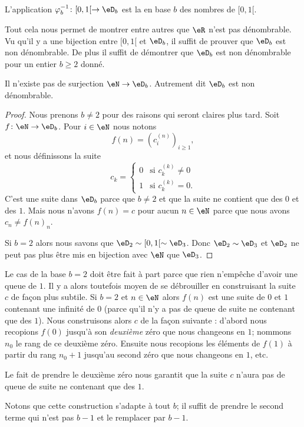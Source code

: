 L'application \( \varphi_b^{-1}\colon \mathopen[ 0 , 1 [\to \eD_b\) est la  en base \( b\) des nombres de \( \mathopen[ 0 , 1 [\).

Tout cela nous permet de montrer entre autres que \( \eR\) n'est pas dénombrable. Vu qu'il y a une bijection entre \( \mathopen[ 0 , 1 [\) et \( \eD_b\), il suffit de prouver que \( \eD_b\) est non dénombrable. De plus il suffit de démontrer que \( \eD_b\) est non dénombrable pour un entier \( b\geq 2\) donné.

\begin{proposition}  \label{PropNNHooYTVFw}
	Il n'existe pas de surjection \( \eN\to \eD_b\). Autrement dit \( \eD_b\) est non dénombrable.
\end{proposition}

\begin{proof}
	Nous prenons \( b\neq 2\) pour des raisons qui seront claires plus tard. Soit \( f\colon \eN\to \eD_b\). Pour \( i\in \eN\) nous notons
	\begin{equation}
		f(n)=(c_i^{(n)})_{i\geq 1},
	\end{equation}
	et nous définissons la suite
	\begin{equation}
		c_k=\begin{cases}
			0 & \text{si } c_k^{(k)}\neq 0 \\
			1 & \text{si } c_k^{(k)}=0.
		\end{cases}
	\end{equation}
	C'est une suite dans \( \eD_b\) parce que \( b\neq 2\) et que la suite ne contient que des \( 0\) et des \( 1\). Mais nous n'avons \( f(n)=c\) pour aucun \( n\in \eN\) parce que nous avons \( c_n\neq f(n)_n\).

	Si \( b=2\) alors nous savons que \( \eD_2\sim\mathopen[ 0 , 1 [\sim \eD_3\). Donc \( \eD_2\sim \eD_3\) et \( \eD_2\) ne peut pas plus être mis en bijection avec \( \eN\) que \( \eD_3\).
\end{proof}

\begin{remark}
	Le cas de la base \( b=2\) doit être fait à part parce que rien n'empêche d'avoir une queue de \( 1\). Il y a alors toutefois moyen de se débrouiller en construisant la suite \( c\) de façon plus subtile. Si \( b=2\) et \( n\in \eN\) alors \( f(n)\) est une suite de \( 0\) et \( 1\) contenant une infinité de \( 0\) (parce qu'il n'y a pas de queue de suite ne contenant que des \( 1\)). Nous construisons alors \( c\) de la façon suivante : d'abord nous recopions \( f(0)\) jusqu'à son \emph{deuxième} zéro que nous changeons en \( 1\); nommons \( n_0\) le rang de ce deuxième zéro. Ensuite nous recopions les éléments de \( f(1) \) à partir du rang \( n_0+1\) jusqu'au second zéro que nous changeons en \( 1\), etc.

	Le fait de prendre le deuxième zéro nous garantit que la suite \( c\) n'aura pas de queue de suite ne contenant que des \( 1\).

	Notons que cette construction s'adapte à tout \( b\); il suffit de prendre le second terme qui n'est pas \( b-1\) et le remplacer par \( b-1\).
\end{remark}

